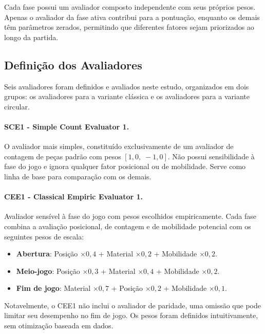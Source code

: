 \documentclass[12pt]{article}
\begin{document}
Cada fase possui um avaliador composto independente com seus próprios pesos. Apenas o avaliador
da fase ativa contribui para a pontuação, enquanto os demais têm parâmetros zerados, permitindo que
diferentes fatores sejam priorizados ao longo da partida.
 
\subsection{Definição dos Avaliadores}
 
Seis avaliadores foram definidos e avaliados neste estudo, organizados em dois grupos: os
avaliadores para a variante clássica e os avaliadores para a variante circular.
 
\paragraph{SCE1 - Simple Count Evaluator 1.}
O avaliador mais simples, constituído exclusivamente de um %
avaliador de contagem de peças padrão com pesos $[1{,}0,\; {-}1{,}0]$. Não possui sensibilidade à fase do jogo e ignora qualquer
fator posicional ou de mobilidade. Serve como linha de base para comparação com os demais.
 
\paragraph{CEE1 - Classical Empiric Evaluator 1.}
Avaliador sensível à fase do jogo com pesos escolhidos empiricamente. Cada fase combina
a avaliação posicional, de contagem e de mobilidade potencial
com os seguintes pesos de escala:
\begin{itemize}
  \item \textbf{Abertura}: Posição $\times 0{,}4$ + Material $\times 0{,}2$ +
    Mobilidade $\times 0{,}2$.
  \item \textbf{Meio-jogo}: Posição $\times 0{,}3$ + Material $\times 0{,}4$ +
    Mobilidade $\times 0{,}2$.
  \item \textbf{Fim de jogo}: Material $\times 0{,}7$ + Posição $\times 0{,}2$ +
    Mobilidade $\times 0{,}1$.
\end{itemize}
Notavelmente, o CEE1 não inclui o 
avaliador de paridade, uma omissão que pode limitar
seu desempenho no fim de jogo. Os pesos foram definidos intuitivamente, sem otimização
baseada em dados.
 
\end{document}
